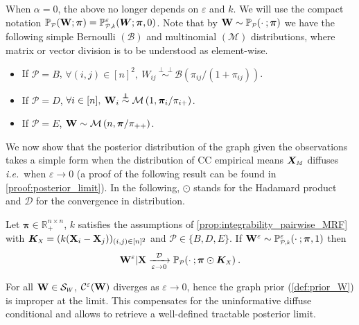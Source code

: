 When $\alpha = 0$, the above no longer depends on $\varepsilon$ and $k$. We will use the compact notation $\mathbb{P}_{\scaleto{\mathcal{P}}{4pt}}(\W ; \bm{\pi}) = \mathbb{P}_{\scaleto{\mathcal{P},k}{5pt}}^{\varepsilon}(\bm{W}; \bm{\pi}, 0)$. Note that by $\W \sim \mathbb{P}_{\scaleto{\mathcal{P}}{4pt}}(\cdot \: ; \bm{\pi})$ we have the following simple Bernoulli $(\mathcal{B})$ and multinomial $(\mathcal{M})$ distributions, where matrix or vector division is to be understood as element-wise.
\begin{itemize}
    \item If $\mathcal{P} = B$, $\forall (i,j) \in [n]^2, \: W_{ij} \stackrel{\perp\!\!\!\!\perp}{\sim} \mathcal{B}\left(\pi_{ij}/(1 + \pi_{ij}) \right)$.
    \item If $\mathcal{P} = D$, $\forall i \in [n], \: \mathbf{W}_{i} \stackrel{\perp\!\!\!\!\perp}{\sim} \mathcal{M}\left(1, \bm{\pi}_{i}/\pi_{i+} \right)$.
    \item If $\mathcal{P} = E$, $\mathbf{W} \sim \mathcal{M}\left(n, \bm{\pi}/\pi_{++} \right)$.
\end{itemize}

We now show that the posterior distribution of the graph given the observations takes a simple form when the distribution of CC empirical means $\bm{X}_{\scaleto{M}{4pt}}$ diffuses \textit{i.e.}\ when $\varepsilon \to 0$ (a proof of the following result can be found in \cref{proof:posterior_limit}). In the following, $\odot$ stands for the Hadamard product and $\mathcal{D}$ for the convergence in distribution.

\begin{proposition}\label{prop:posterior_W}
Let $\bm{\pi} \in \mathbb{R}_+^{n \times n}$, $k$ satisfies the assumptions of \cref{prop:integrability_pairwise_MRF} with  $\bm{K}_{\scaleto{X}{4pt}} = (k(\X_{i} - \X_{j}))_{(i,j) \in [n]^2}$ and $\mathcal{P}\in \{B, D, E\}$. If $\W^{\varepsilon} \sim \mathbb{P}_{\scaleto{\mathcal{P},k}{5pt}}^{\varepsilon}(\cdot \: ; \bm{\pi},1)$ then
$$\W^{\varepsilon} | \X \xrightarrow[\varepsilon \to 0]{\mathcal{D}} \mathbb{P}_{\scaleto{\mathcal{P}}{4pt}}(\cdot \: ;\bm{\pi} \odot \bm{K}_{\scaleto{X}{4pt}}) \:.$$
\end{proposition}

\begin{remark}
For all $\W \in \mathcal{S}_{\scaleto{W}{4pt}}$, $\mathcal{C}^{\varepsilon}(\mathbf{W})$ diverges as $\varepsilon \to 0$, hence the graph prior (\cref{def:prior_W}) is improper at the limit. This compensates for the uninformative diffuse conditional and allows to retrieve a well-defined tractable posterior limit.
\end{remark}

